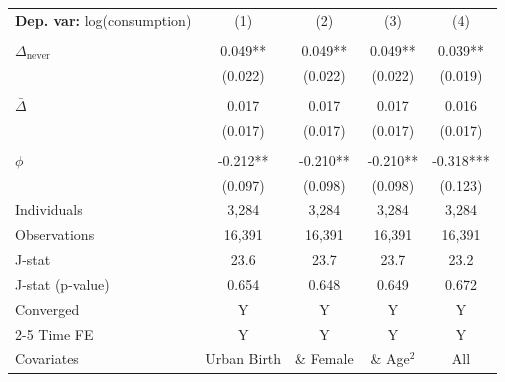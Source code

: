 \begin{tabular}{l cccc} \toprule  \textbf{Dep. var:}  log(consumption) 
                    &\multicolumn{1}{c}{(1)}   &\multicolumn{1}{c}{(2)}   &\multicolumn{1}{c}{(3)}   &\multicolumn{1}{c}{(4)}   \\
                    &               &               &               &               \\
\addlinespace
$\Delta_{\text{never}}$&       0.049** &       0.049** &       0.049** &       0.039** \\
                    &     (0.022)   &     (0.022)   &     (0.022)   &     (0.019)   \\
                    &               &               &               &               \\
\addlinespace
$\bar{\Delta}$      &       0.017   &       0.017   &       0.017   &       0.016   \\
                    &     (0.017)   &     (0.017)   &     (0.017)   &     (0.017)   \\
                    &               &               &               &               \\
\addlinespace
$\phi$              &      -0.212** &      -0.210** &      -0.210** &      -0.318***\\
                    &     (0.097)   &     (0.098)   &     (0.098)   &     (0.123)   \\
\addlinespace
Individuals         &       3,284   &       3,284   &       3,284   &       3,284   \\
Observations        &      16,391   &      16,391   &      16,391   &      16,391   \\
J-stat              &        23.6   &        23.7   &        23.7   &        23.2   \\
J-stat (p-value)    &       0.654   &       0.648   &       0.649   &       0.672   \\
Converged           &           Y   &           Y   &           Y   &           Y   \\
\cmidrule{2-5} Time FE & Y & Y & Y & Y \\ Covariates & Urban Birth & \& Female & \& Age$^2$ & All \\ \bottomrule \end{tabular}
